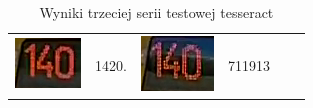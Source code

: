 \begin{table}[h!]
\begin{tabular}{c l c l c l}
    \\
    \begin{minipage}{.2\textwidth}
      \includegraphics[width=\textwidth]{img/exp_number_f07}
    \end{minipage}
    &
     1420.
    &
    \begin{minipage}{.2\textwidth}
      \includegraphics[width=\textwidth]{img/exp_number_f08}
    \end{minipage}
    &
     711913
    &

  \end{tabular}
  \caption{Wyniki trzeciej serii testowej tesseract}\label{tbl:tess_03}
\end{table}

